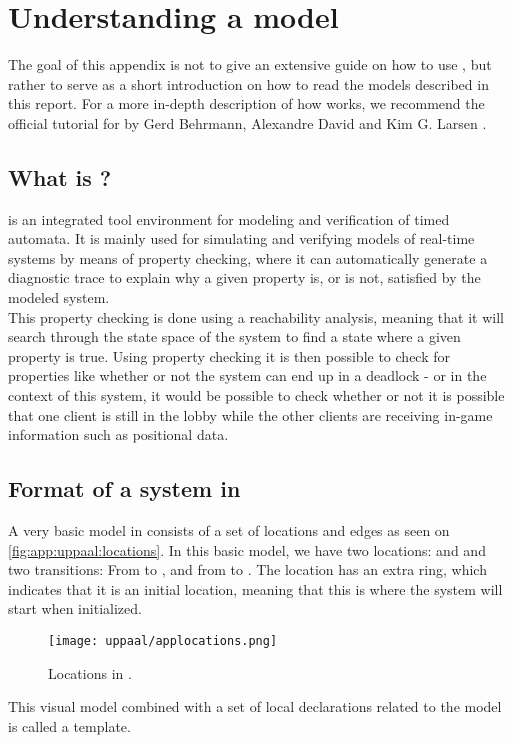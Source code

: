 \section{Understanding a \uppaal model}\label{app:uppaal}

The goal of this appendix is not to give an extensive guide on how to use \uppaal, but rather to serve as a short introduction on how to read the models described in this report.
For a more in-depth description of how \uppaal works, we recommend the official tutorial for  by Gerd Behrmann, Alexandre David and Kim G. Larsen \cite{uppaaltutorial}.

\subsection{What is \uppaal?}
\uppaal is an integrated tool environment for modeling and verification of timed automata.
It is mainly used for simulating and verifying models of real-time systems \cite{uppaalintro} by means of property checking, where it can automatically generate a diagnostic trace to explain why a given property is, or is not, satisfied by the modeled system.\\
This property checking is done using a reachability analysis, meaning that it will search through the state space of the system to find a state where a given property is true.
Using property checking it is then possible to check for properties like whether or not the system can end up in a deadlock - or in the context of this system, it would be possible to check whether or not it is possible that one client is still in the lobby while the other clients are receiving in-game information such as positional data.

\subsection{Format of a system in \uppaal}
A very basic model in \uppaal consists of a set of locations and edges as seen on \autoref{fig:app:uppaal:locations}.
In this basic model, we have two locations:  and  and two transitions: From  to , and from  to .
The location  has an extra ring, which indicates that it is an initial location, meaning that this is where the system will start when initialized.

\begin{figure}[H]
    \centering
    \texttt{[image: uppaal/applocations.png]}
    \caption{Locations in \uppaal.}
    \label{fig:app:uppaal:locations}
\end{figure}
\noindent
This visual model combined with a set of local declarations related to the model is called a template.

